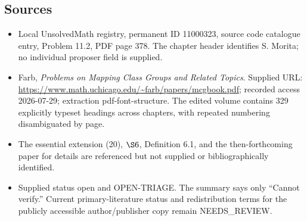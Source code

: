 \documentclass[11pt]{article}
\begin{document}
\subsection{Sources}
\begin{itemize}
\item Local UnsolvedMath registry, permanent ID 11000323, source code catalogue entry, Problem 11.2, PDF page 378. The chapter header identifies S. Morita; no individual proposer field is supplied.
\item Farb, \emph{Problems on Mapping Class Groups and Related Topics}. Supplied URL: \url{https://www.math.uchicago.edu/~farb/papers/mcgbook.pdf}; recorded access 2026-07-29; extraction pdf-font-structure. The edited volume contains 329 explicitly typeset headings across chapters, with repeated numbering disambiguated by page.
\item The essential extension (20), \(\S6\), Definition 6.1, and the then-forthcoming paper for details are referenced but not supplied or bibliographically identified.
\item Supplied status open and OPEN-TRIAGE. The summary says only ``Cannot verify.'' Current primary-literature status and redistribution terms for the publicly accessible author/publisher copy remain NEEDS\_REVIEW.
\end{itemize}
\end{document}
